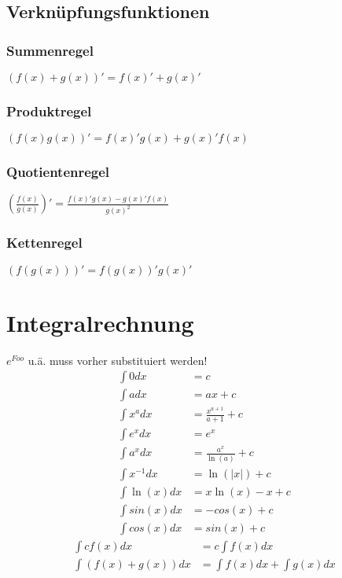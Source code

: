 \documentclass[a4paper, 8pt, landscape]{extarticle}
\let\oldint\int
\renewcommand{\int}{\ensuremath{\textstyle\oldint}}
\begin{document}
\begin{multicols*}{5}
        \subsection{Verknüpfungsfunktionen}
            \subsubsection{Summenregel}
            $(f(x) + g(x))' = f(x)' + g(x)'$  \\
            \subsubsection{Produktregel}
            $(f(x)g(x))' = f(x)'g(x)+g(x)'f(x)$  \\
            \subsubsection{Quotientenregel}
            $(\frac{f(x)}{g(x)})' = \frac{f(x)'g(x)-g(x)'f(x)}{g(x)^2}$ \\
            \subsubsection{Kettenregel}
            $(f(g(x)))' = f(g(x))'g(x)'$ \\
	\section{Integralrechnung}
	    $e^{Foo}$ u.ä. muss vorher substituiert werden!\\
        \begin{align*}
        	\int 0 dx &= c\\
	        \int a dx &= ax+c\\
	        \int x^a dx &= \frac{x^{a+1}}{a+1}+c\\
	        \int e^x dx &= e^x\\
	        \int a^x dx &= \frac{a^x}{\ln(a)}+c\\
	        \int x^{-1} dx &= \ln(|x|)+c\\
	        \int \ln (x) dx &= x\ln(x)-x +c\\
	        \int sin(x) dx &= -cos(x)+c\\
	        \int cos(x) dx &= sin(x)+c
        \end{align*}
        \begin{align*}
        	\int cf(x) dx &= c \int f(x) dx\\
        	\int (f(x) + g(x)) dx &= \int f(x) dx + \int g(x) dx
        \end{align*}

\end{multicols*}
\end{document}

